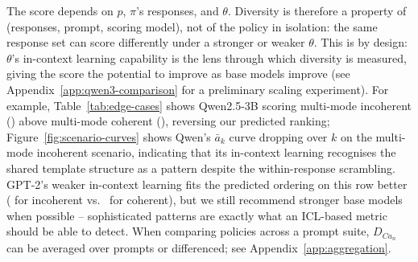 The score depends on $p$, $\pi$'s responses, and $\theta$.
Diversity is therefore a property of (responses, prompt, scoring model), not of the policy in isolation: the same response set can score differently under a stronger or weaker $\theta$.
This is by design: $\theta$'s in-context learning capability is the lens through which diversity is measured, giving the score the potential to improve as base models improve (see Appendix~\ref{app:qwen3-comparison} for a preliminary scaling experiment).
For example, Table~\ref{tab:edge-cases} shows Qwen2.5-3B scoring multi-mode incoherent (\scenarioMultiIncoherentQwenDCan{}) above multi-mode coherent (\scenarioMultiModeQwenDCan{}), reversing our predicted ranking; Figure~\ref{fig:scenario-curves} shows Qwen's $\bar{a}_k$ curve dropping over $k$ on the multi-mode incoherent scenario, indicating that its in-context learning recognises the shared template structure as a pattern despite the within-response scrambling.
GPT-2's weaker in-context learning fits the predicted ordering on this row better (\scenarioMultiIncoherentGptDCan{} for incoherent vs.\ \scenarioMultiModeGptDCan{} for coherent), but we still recommend stronger base models when possible -- sophisticated patterns are exactly what an ICL-based metric should be able to detect.
When comparing policies across a prompt suite, $D_{Ca_n}$ can be averaged over prompts or differenced; see Appendix~\ref{app:aggregation}.

